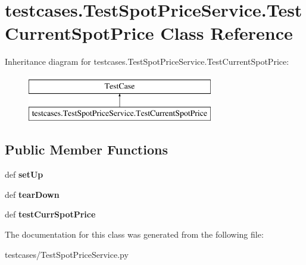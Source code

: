 \hypertarget{classtestcases_1_1TestSpotPriceService_1_1TestCurrentSpotPrice}{\section{testcases.\-Test\-Spot\-Price\-Service.\-Test\-Current\-Spot\-Price Class Reference}
\label{classtestcases_1_1TestSpotPriceService_1_1TestCurrentSpotPrice}
}
Inheritance diagram for testcases.\-Test\-Spot\-Price\-Service.\-Test\-Current\-Spot\-Price\-:\begin{figure}[H]
\begin{center}
\leavevmode
\includegraphics[height=2.000000cm]{classtestcases_1_1TestSpotPriceService_1_1TestCurrentSpotPrice}
\end{center}
\end{figure}
\subsection*{Public Member Functions}
\begin{DoxyCompactItemize}
\item 
\hypertarget{classtestcases_1_1TestSpotPriceService_1_1TestCurrentSpotPrice_aaad8d5282187b3dd41da24e6b5a06bdf}{def {\bfseries set\-Up}}\label{classtestcases_1_1TestSpotPriceService_1_1TestCurrentSpotPrice_aaad8d5282187b3dd41da24e6b5a06bdf}

\item 
\hypertarget{classtestcases_1_1TestSpotPriceService_1_1TestCurrentSpotPrice_a43920ee6c79c3e7ad48605d595d46606}{def {\bfseries tear\-Down}}\label{classtestcases_1_1TestSpotPriceService_1_1TestCurrentSpotPrice_a43920ee6c79c3e7ad48605d595d46606}

\item 
\hypertarget{classtestcases_1_1TestSpotPriceService_1_1TestCurrentSpotPrice_a86591be3831f00907ea2bc903dff5143}{def {\bfseries test\-Curr\-Spot\-Price}}\label{classtestcases_1_1TestSpotPriceService_1_1TestCurrentSpotPrice_a86591be3831f00907ea2bc903dff5143}

\end{DoxyCompactItemize}


The documentation for this class was generated from the following file\-:\begin{DoxyCompactItemize}
\item 
testcases/Test\-Spot\-Price\-Service.\-py\end{DoxyCompactItemize}
